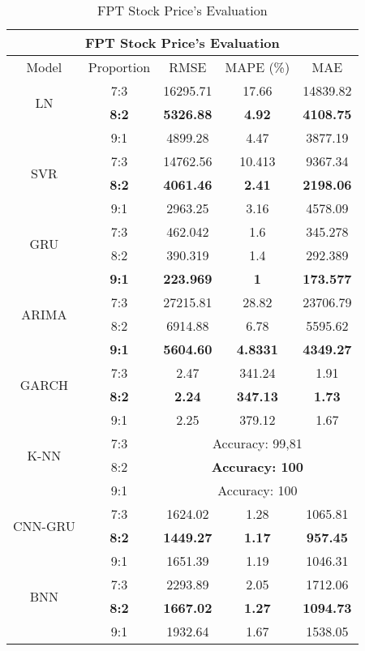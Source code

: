 \documentclass{ieeeojies}
\begin{document}
\begin{table}[H]
    \centering
    \begin{tabular}{|c|c|c|c|c|}
         \hline
         \multicolumn{5}{|c|}{\textbf{FPT Stock Price's Evaluation}}\\
         \hline
         \centering Model & Proportion & RMSE & MAPE (\%) & MAE\\
         \hline
         \multirow{2}{*}{LN} & 7:3 & 16295.71 & 17.66 & 14839.82 \\ & \textbf{8:2} & \textbf{5326.88} & \textbf{4.92} & \textbf{4108.75} \\ & 9:1 & 4899.28 & 4.47 & 3877.19\\
         \hline
         \multirow{2}{*}{SVR} & 7:3 &14762.56 & 10.413&9367.34\\ & \textbf{8:2} &\textbf{4061.46} & \textbf{2.41}& \textbf{2198.06}\\ & 9:1 &2963.25  &3.16  &4578.09 \\
         \hline
         \multirow{2}{*}{GRU} & 7:3	& 462.042& 1.6 &345.278  \\ & 8:2 &390.319 &  1.4&292.389  \\ & \textbf{9:1} &\textbf{223.969}   & \textbf{1} &\textbf{173.577}\\
         \hline
         \multirow{2}{*}{ARIMA} & 7:3 &  27215.81 & 28.82 & 23706.79 \\ & 8:2 &  6914.88 & 6.78 & 5595.62 \\ & \textbf{9:1} & \textbf{5604.60}  & \textbf{4.8331} & \textbf{4349.27}\\
         \hline
         \multirow{2}{*}{GARCH} & 7:3	& 2.47 & 341.24 & 1.91 \\ & \textbf{8:2} & \textbf{2.24} & \textbf{347.13} & \textbf{1.73} \\ & 9:1 & 2.25 & 379.12 & 1.67\\
         \hline
         \multirow{2}{*}{K-NN} & 7:3 & \multicolumn{3}{c|}{Accuracy: 99,81}  \\ & 8:2 & \multicolumn{3}{c|}{\textbf{Accuracy: 100}}   \\ & 9:1 & \multicolumn{3}{c|}{Accuracy: 100}   \\
         \hline
         \multirow{2}{*}{CNN-GRU} & 7:3 &1624.02  & 1.28  &1065.81  \\ & \textbf{8:2} & \textbf{1449.27} &\textbf{1.17} & \textbf{957.45} \\ & 9:1 &  1651.39 &1.19	 & 1046.31	 \\
         \hline
         \multirow{2}{*}{BNN} & 7:3 &  2293.89 & 2.05  & 1712.06 \\ & \textbf{8:2} & \textbf{1667.02}  & \textbf{1.27} & \textbf{1094.73}\\ & 9:1 & 1932.64 & 1.67 & 1538.05\\
         \hline
    \end{tabular}
    \caption{FPT Stock Price's Evaluation}
    \label{FPTresult}
\end{table}
\end{document}
